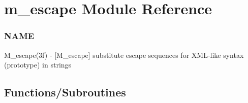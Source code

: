 \hypertarget{namespacem__escape}{}\section{m\+\_\+escape Module Reference}
\label{namespacem__escape}


\subsubsection*{N\+A\+ME}

M\+\_\+escape(3f) -\/ \mbox{[}M\+\_\+escape\mbox{]} substitute escape sequences for X\+M\+L-\/like syntax (prototype) in strings  


\subsection*{Functions/\+Subroutines}
